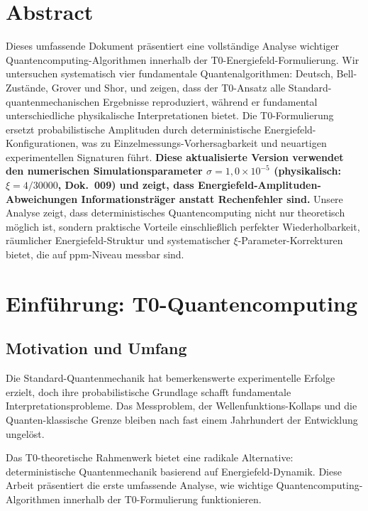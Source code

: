 \section*{Abstract}
		Dieses umfassende Dokument präsentiert eine vollständige Analyse wichtiger Quantencomputing-Algorithmen innerhalb der T0-Energiefeld-Formulierung. Wir untersuchen systematisch vier fundamentale Quantenalgorithmen: Deutsch, Bell-Zustände, Grover und Shor, und zeigen, dass der T0-Ansatz alle Standard-quantenmechanischen Ergebnisse reproduziert, während er fundamental unterschiedliche physikalische Interpretationen bietet. Die T0-Formulierung ersetzt probabilistische Amplituden durch deterministische Energiefeld-Konfigurationen, was zu Einzelmessungs-Vorhersagbarkeit und neuartigen experimentellen Signaturen führt. \textbf{Diese aktualisierte Version verwendet den numerischen Simulationsparameter $\sigma = 1{,}0 \times 10^{-5}$ (physikalisch: $\xi = 4/30000$, Dok.~009) und zeigt, dass Energiefeld-Amplituden-Abweichungen Informationsträger anstatt Rechenfehler sind.} Unsere Analyse zeigt, dass deterministisches Quantencomputing nicht nur theoretisch möglich ist, sondern praktische Vorteile einschließlich perfekter Wiederholbarkeit, räumlicher Energiefeld-Struktur und systematischer $\xi$-Parameter-Korrekturen bietet, die auf ppm-Niveau messbar sind.

	
	
	\section{Einführung: T0-Quantencomputing}
	
	\subsection{Motivation und Umfang}
	
	Die Standard-Quantenmechanik hat bemerkenswerte experimentelle Erfolge erzielt, doch ihre probabilistische Grundlage schafft fundamentale Interpretationsprobleme. Das Messproblem, der Wellenfunktions-Kollaps und die Quanten-klassische Grenze bleiben nach fast einem Jahrhundert der Entwicklung ungelöst.
	
	Das T0-theoretische Rahmenwerk bietet eine radikale Alternative: deterministische Quantenmechanik basierend auf Energiefeld-Dynamik. Diese Arbeit präsentiert die erste umfassende Analyse, wie wichtige Quantencomputing-Algorithmen innerhalb der T0-Formulierung funktionieren.
	
